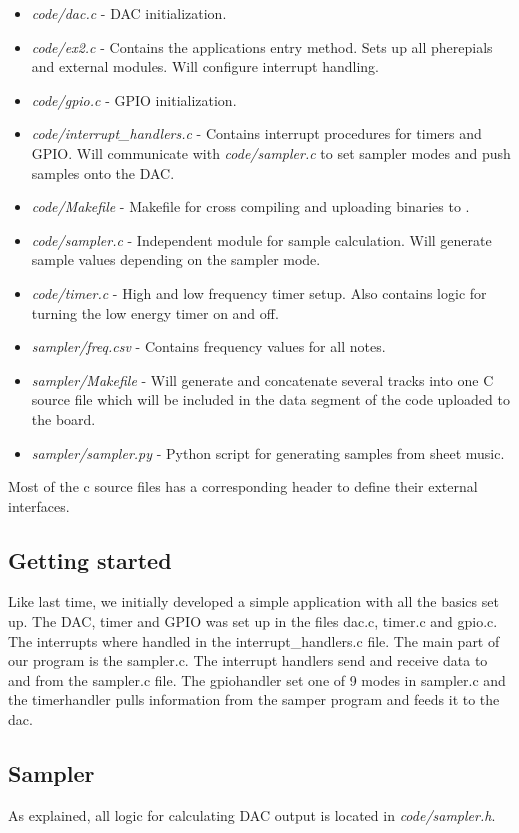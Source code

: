 \begin{itemize}
	\item \emph{code/dac.c} - DAC initialization.
	\item \emph{code/ex2.c} - Contains the applications entry method. Sets up all pherepials and external modules. Will configure interrupt handling.
	\item \emph{code/gpio.c} - GPIO initialization.
	\item \emph{code/interrupt\_handlers.c} - Contains interrupt procedures for timers and GPIO. Will communicate with \emph{code/sampler.c} to set sampler modes and push samples onto the DAC.
	\item \emph{code/Makefile} - Makefile for cross compiling and uploading binaries to \boardName .
	\item \emph{code/sampler.c} - Independent module for sample calculation. Will generate sample values depending on the sampler mode.
	\item \emph{code/timer.c} - High and low frequency timer setup. Also contains logic for turning the low energy timer on and off.
	\item \emph{sampler/freq.csv} - Contains frequency values for all notes.
	\item \emph{sampler/Makefile} - Will generate and concatenate several tracks into one C source file which will be included in the data segment of the code uploaded to the board.
	\item \emph{sampler/sampler.py} - Python script for generating samples from sheet music.

\end{itemize}

Most of the c source files has a corresponding header to define their external interfaces.

\subsection{Getting started}
Like last time, we initially developed a simple application with all the basics set up. The DAC, timer and GPIO was set up in the files dac.c, timer.c and gpio.c. The interrupts where handled in the interrupt\_handlers.c file. The main part of our program is the sampler.c. The interrupt handlers send and receive data to and from the sampler.c file. The gpiohandler set one of 9 modes in sampler.c and the timerhandler pulls information from the samper program and feeds it to the dac. 

\subsection{Sampler}
As explained, all logic for calculating DAC output is located in \emph{code/sampler.h}.
